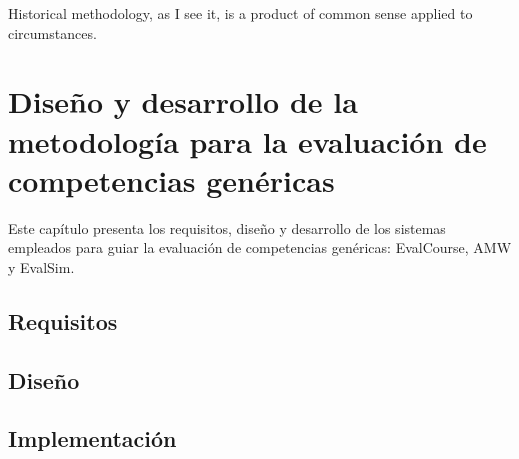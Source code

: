 

\begin{savequote}[50mm]
Historical methodology, as I see it, is a product of common sense applied to circumstances. 
\end{savequote}


\chapter{Diseño y desarrollo de la metodología para la evaluación de competencias genéricas}
\label{cha:Overall methodology}

\ifpdf
    \graphicspath{{3_overall_methodology/figures/PNG/}{3_overall_methodology/figures/PDF/}{3_overall_methodology/figures/}}
\else
    \graphicspath{{3_overall_methodology/figures/EPS/}{3_overall_methodology/figures/}}
\fi



\cite{turing1950computing}

Este capítulo presenta los requisitos, diseño y desarrollo de los sistemas empleados para guiar la evaluación de competencias genéricas: EvalCourse, AMW y EvalSim.




\section{Requisitos}

\section{Diseño}

\section{Implementación}







